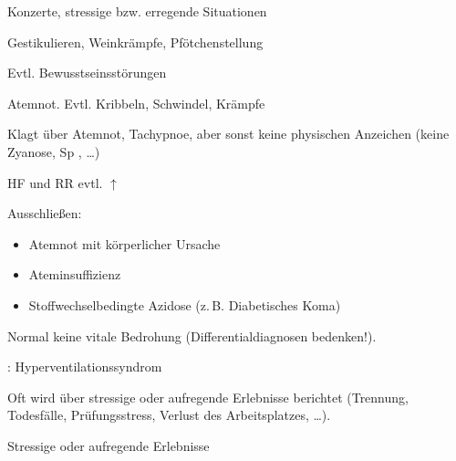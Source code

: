 {
\begin{ABCDESlide}
  \item[\ABCDE{1}] Konzerte, stressige bzw. erregende
  Situationen
  \item[\ABCDE{2}] Gestikulieren, Weinkrämpfe,
  Pfötchenstellung
  \item[\ABCDE{3}] Evtl. Bewusstseinsstörungen
  \item[\ABCDE{4}] Atemnot. Evtl. Kribbeln, Schwindel,
  Krämpfe
  \item[\ABCDE{B}] Klagt über Atemnot, Tachypnoe, aber sonst
  keine physischen Anzeichen (keine Zyanose, Sp
  \SymbolFindingNormal, \ldots)
  \item[\ABCDE{C}] HF und RR evtl. $\uparrow$
  \item[\ABCDE{E}] Ausschließen:
  \begin{itemize}
    \item Atemnot mit körperlicher Ursache
    \item Ateminsuffizienz
    \item Stoffwechselbedingte Azidose (z.\,B. Diabetisches Koma)
  \end{itemize}
  \item[\ABCDE{=}] Normal keine vitale Bedrohung
  (Differentialdiagnosen bedenken!).
\end{ABCDESlide}
}
{}
{}
{}

\TextSlide
{{\TxSAMPLER}: Hyperventilationssyndrom}
{
\begin{SAMPLERText}
  \item[\SAMPLER{E}] Oft wird über stressige oder aufregende
  Erlebnisse berichtet (Trennung, Todesfälle, Prüfungsstress,
  Verlust des Arbeitsplatzes,
  \ldots).
\end{SAMPLERText}
}
{
\begin{SAMPLERSlide}
  \item[\SAMPLER{E}] Stressige oder aufregende
  Erlebnisse
\end{SAMPLERSlide}
}
{}
{}
{}





\ChapterEnd
